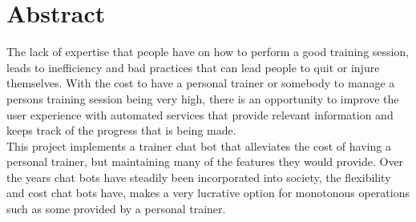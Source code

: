 \chapter*{Abstract}

The lack of expertise that people have on how to perform a good training session, leads to inefficiency and bad practices that can lead people to quit or injure themselves. With the cost to have a personal trainer or somebody to manage a persons training session being very high, there is an opportunity to improve the user experience with automated services that provide relevant information and keeps track of the progress that is being made.\\

This project implements a trainer chat bot that alleviates the cost of having a personal trainer, but maintaining many of the features they would provide. Over the years chat bots have steadily been incorporated into society, the flexibility and cost chat bots have, makes a very lucrative option for monotonous operations such as some provided by a personal trainer. 




